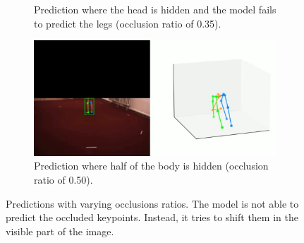 \documentclass[runningheads]{llncs}
\begin{document}
\begin{figure}[ht]
\begin{subfigure}[t]{0.49\textwidth}
    \caption{Prediction where the head is hidden and the model fails to predict the legs (occlusion ratio of 0.35).}
    \label{fig: head hidden comp}
  \end{subfigure}
  \hfill
  \begin{subfigure}[t]{0.49\textwidth}
    \centering
    \includegraphics[width=\textwidth]{assets/pred_spider.png}
    \caption{Prediction where half of the body is hidden (occlusion ratio of 0.50).}
    \label{fig: spider}
  \end{subfigure}
  \caption{Predictions with varying occlusions ratios. The model is not able to predict the occluded keypoints. Instead, it tries to shift them in the visible part of the image.}
  \label{fig: predictions varying occlusion ratios}
\end{figure}
\end{document}
